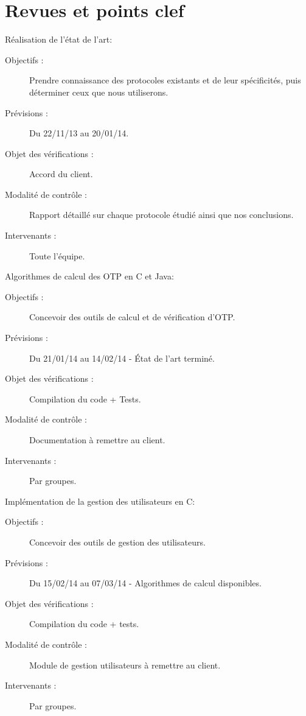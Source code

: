 \documentclass{../../res/univ-projet}
\begin{document}
	\newpage
\section{Revues et points clef}

\begin{description}
	\item Réalisation de l'état de l'art:
	\begin{description}
		\item[Objectifs :] Prendre connaissance des protocoles existants et de leur spécificités, puis déterminer ceux que nous utiliserons.
		\item[Prévisions :] Du 22/11/13 au 20/01/14.
		\item[Objet des vérifications :] Accord du client.
		\item[Modalité de contrôle :] Rapport détaillé sur chaque protocole étudié ainsi que nos conclusions.
		\item[Intervenants :] Toute l'équipe.
	\end{description}
	\vfill
	\item Algorithmes de calcul des OTP en C et Java:
	\begin{description}
		\item[Objectifs :] Concevoir des outils de calcul et de vérification d'OTP.
		\item[Prévisions :] Du 21/01/14 au 14/02/14 - État de l'art terminé.
		\item[Objet des vérifications :] Compilation du code + Tests.
		\item[Modalité de contrôle :] Documentation à remettre au client.
		\item[Intervenants :] Par groupes.
	\end{description}
	\vfill
	\item Implémentation de la gestion des utilisateurs en C:
	\begin{description}
		\item[Objectifs :] Concevoir des outils de gestion des utilisateurs.
		\item[Prévisions :] Du 15/02/14 au 07/03/14 - Algorithmes de calcul disponibles.
		\item[Objet des vérifications :] Compilation du code + tests.
		\item[Modalité de contrôle :] Module de gestion utilisateurs à remettre au client.
		\item[Intervenants :] Par groupes.

\end{description}
\end{description}
\end{document}
